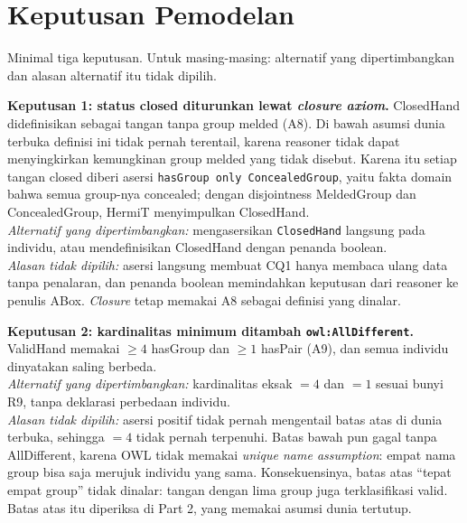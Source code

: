 \documentclass[11pt,a4paper]{article}
\begin{document}
\section{Keputusan Pemodelan}

Minimal tiga keputusan. Untuk masing-masing: alternatif yang dipertimbangkan dan
alasan alternatif itu tidak dipilih.

\textbf{Keputusan 1: status closed diturunkan lewat \emph{closure axiom}.}
ClosedHand didefinisikan sebagai tangan tanpa group melded (A8). Di bawah asumsi
dunia terbuka definisi ini tidak pernah terentail, karena reasoner tidak dapat
menyingkirkan kemungkinan group melded yang tidak disebut. Karena itu setiap tangan
closed diberi asersi \texttt{hasGroup only ConcealedGroup}, yaitu fakta domain bahwa
semua group-nya concealed; dengan disjointness MeldedGroup dan ConcealedGroup,
HermiT menyimpulkan ClosedHand.\\
\textit{Alternatif yang dipertimbangkan:} mengasersikan \texttt{ClosedHand} langsung
pada individu, atau mendefinisikan ClosedHand dengan penanda boolean.\\
\textit{Alasan tidak dipilih:} asersi langsung membuat CQ1 hanya membaca ulang data
tanpa penalaran, dan penanda boolean memindahkan keputusan dari reasoner ke penulis
ABox. \emph{Closure} tetap memakai A8 sebagai definisi yang dinalar.

\textbf{Keputusan 2: kardinalitas minimum ditambah \texttt{owl:AllDifferent}.}
ValidHand memakai ${\geq}4$ hasGroup dan ${\geq}1$ hasPair (A9), dan semua individu
dinyatakan saling berbeda.\\
\textit{Alternatif yang dipertimbangkan:} kardinalitas eksak ${=}4$ dan ${=}1$ sesuai
bunyi R9, tanpa deklarasi perbedaan individu.\\
\textit{Alasan tidak dipilih:} asersi positif tidak pernah mengentail batas atas di
dunia terbuka, sehingga ${=}4$ tidak pernah terpenuhi. Batas bawah pun gagal tanpa
AllDifferent, karena OWL tidak memakai \emph{unique name assumption}: empat nama group
bisa saja merujuk individu yang sama. Konsekuensinya, batas atas ``tepat empat
group'' tidak dinalar: tangan dengan lima group juga terklasifikasi valid. Batas atas
itu diperiksa di Part 2, yang memakai asumsi dunia tertutup.
\end{document}
